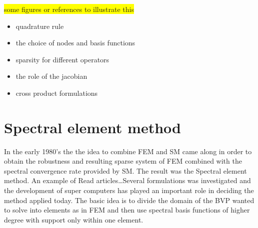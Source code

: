 \colorbox{yellow}{some figures or references to illustrate this}

\begin{itemize}
\item quadrature rule
\item the choice of nodes and basis functions
\item sparsity for different operators
\item the role of the jacobian 
\item cross product formulations

\end{itemize}

\cite{Canuto}


\section{Spectral element method}
In the early 1980's the the idea to combine FEM and SM came along in order to obtain the robustness and resulting sparse system of FEM 
combined with the spectral convergence rate provided by SM. 
The result was the Spectral element method. An example of Read articles\ldots Several formulations was investigated  and the development of super computers has played an important role in deciding the method applied today. The basic idea is to divide the domain 
of the BVP wanted to solve into elements as in FEM and then use spectral basis functions of higher degree with support only within one element. 

